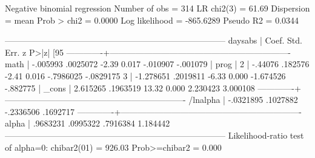 Negative binomial regression                      Number of obs   =        314
LR chi2(3)      =      61.69
Dispersion     = mean                             Prob > chi2     =     0.0000
Log likelihood = -865.6289                        Pseudo R2       =     0.0344

------------------------------------------------------------------------------
daysabs |      Coef.   Std. Err.      z    P>|z|     [95%
-------------+----------------------------------------------------------------
math |   -.005993   .0025072    -2.39   0.017     -.010907    -.001079
|
prog |
2  |    -.44076    .182576    -2.41   0.016    -.7986025   -.0829175
3  |  -1.278651   .2019811    -6.33   0.000    -1.674526    -.882775
|
_cons |   2.615265   .1963519    13.32   0.000     2.230423    3.000108
-------------+----------------------------------------------------------------
/lnalpha |  -.0321895   .1027882                     -.2336506    .1692717
-------------+----------------------------------------------------------------
alpha |   .9683231   .0995322                      .7916384    1.184442
------------------------------------------------------------------------------
Likelihood-ratio test of alpha=0:  chibar2(01) =  926.03 Prob>=chibar2 = 0.000

